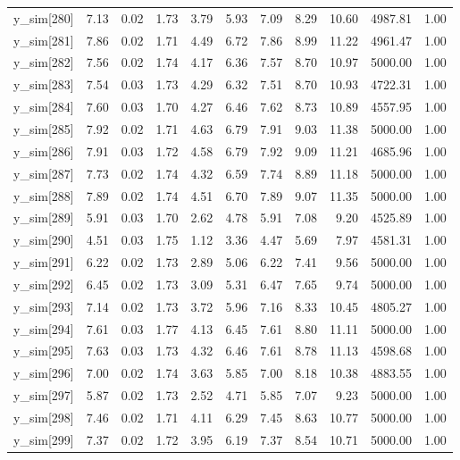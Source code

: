 \begin{table}[ht]
\begin{tabular}{rrrrrrrrrrr}
  y\_sim[280] & 7.13 & 0.02 & 1.73 & 3.79 & 5.93 & 7.09 & 8.29 & 10.60 & 4987.81 & 1.00 \\ 
  y\_sim[281] & 7.86 & 0.02 & 1.71 & 4.49 & 6.72 & 7.86 & 8.99 & 11.22 & 4961.47 & 1.00 \\ 
  y\_sim[282] & 7.56 & 0.02 & 1.74 & 4.17 & 6.36 & 7.57 & 8.70 & 10.97 & 5000.00 & 1.00 \\ 
  y\_sim[283] & 7.54 & 0.03 & 1.73 & 4.29 & 6.32 & 7.51 & 8.70 & 10.93 & 4722.31 & 1.00 \\ 
  y\_sim[284] & 7.60 & 0.03 & 1.70 & 4.27 & 6.46 & 7.62 & 8.73 & 10.89 & 4557.95 & 1.00 \\ 
  y\_sim[285] & 7.92 & 0.02 & 1.71 & 4.63 & 6.79 & 7.91 & 9.03 & 11.38 & 5000.00 & 1.00 \\ 
  y\_sim[286] & 7.91 & 0.03 & 1.72 & 4.58 & 6.79 & 7.92 & 9.09 & 11.21 & 4685.96 & 1.00 \\ 
  y\_sim[287] & 7.73 & 0.02 & 1.74 & 4.32 & 6.59 & 7.74 & 8.89 & 11.18 & 5000.00 & 1.00 \\ 
  y\_sim[288] & 7.89 & 0.02 & 1.74 & 4.51 & 6.70 & 7.89 & 9.07 & 11.35 & 5000.00 & 1.00 \\ 
  y\_sim[289] & 5.91 & 0.03 & 1.70 & 2.62 & 4.78 & 5.91 & 7.08 & 9.20 & 4525.89 & 1.00 \\ 
  y\_sim[290] & 4.51 & 0.03 & 1.75 & 1.12 & 3.36 & 4.47 & 5.69 & 7.97 & 4581.31 & 1.00 \\ 
  y\_sim[291] & 6.22 & 0.02 & 1.73 & 2.89 & 5.06 & 6.22 & 7.41 & 9.56 & 5000.00 & 1.00 \\ 
  y\_sim[292] & 6.45 & 0.02 & 1.73 & 3.09 & 5.31 & 6.47 & 7.65 & 9.74 & 5000.00 & 1.00 \\ 
  y\_sim[293] & 7.14 & 0.02 & 1.73 & 3.72 & 5.96 & 7.16 & 8.33 & 10.45 & 4805.27 & 1.00 \\ 
  y\_sim[294] & 7.61 & 0.03 & 1.77 & 4.13 & 6.45 & 7.61 & 8.80 & 11.11 & 5000.00 & 1.00 \\ 
  y\_sim[295] & 7.63 & 0.03 & 1.73 & 4.32 & 6.46 & 7.61 & 8.78 & 11.13 & 4598.68 & 1.00 \\ 
  y\_sim[296] & 7.00 & 0.02 & 1.74 & 3.63 & 5.85 & 7.00 & 8.18 & 10.38 & 4883.55 & 1.00 \\ 
  y\_sim[297] & 5.87 & 0.02 & 1.73 & 2.52 & 4.71 & 5.85 & 7.07 & 9.23 & 5000.00 & 1.00 \\ 
  y\_sim[298] & 7.46 & 0.02 & 1.71 & 4.11 & 6.29 & 7.45 & 8.63 & 10.77 & 5000.00 & 1.00 \\ 
  y\_sim[299] & 7.37 & 0.02 & 1.72 & 3.95 & 6.19 & 7.37 & 8.54 & 10.71 & 5000.00 & 1.00 \\ 

\end{tabular}
\end{table}
